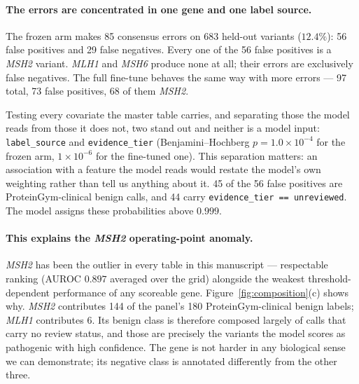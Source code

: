 \documentclass{bioinfo}
\newcommand{\gene}[1]{\textit{#1}}
\begin{document}
\paragraph{The errors are concentrated in one gene and one label source.}
The frozen arm makes \num{85} consensus errors on \num{683} held-out variants
($12.4\%$): \num{56} false positives and \num{29} false negatives. Every one of
the \num{56} false positives is a \gene{MSH2} variant. \gene{MLH1} and
\gene{MSH6} produce none at all; their errors are exclusively false negatives.
The full fine-tune behaves the same way with more errors --- \num{97} total,
\num{73} false positives, \num{68} of them \gene{MSH2}.

Testing every covariate the master table carries, and separating those the model
reads from those it does not, two stand out and neither is a model input:
\texttt{label\_source} and \texttt{evidence\_tier} (Benjamini--Hochberg
$p = 1.0 \times 10^{-4}$ for the frozen arm, $1 \times 10^{-6}$ for the fine-tuned
one). This separation matters: an association with a feature the model reads
would restate the model's own weighting rather than tell us anything about it.
\num{45} of the \num{56} false positives are ProteinGym-clinical benign calls,
and \num{44} carry \texttt{evidence\_tier == unreviewed}. The model assigns these
probabilities above $0.999$.

\paragraph{This explains the \gene{MSH2} operating-point anomaly.}
\gene{MSH2} has been the outlier in every table in this manuscript --- respectable
ranking (AUROC $0.897$ averaged over the grid) alongside the weakest
threshold-dependent performance of any scoreable gene. Figure~\ref{fig:composition}(c)
shows why. \gene{MSH2} contributes \num{144} of the panel's \num{180}
ProteinGym-clinical benign labels; \gene{MLH1} contributes \num{6}. Its benign
class is therefore composed largely of calls that carry no review status, and
those are precisely the variants the model scores as pathogenic with high
confidence. The gene is not harder in any biological sense we can demonstrate;
its negative class is annotated differently from the other three.
\end{document}
